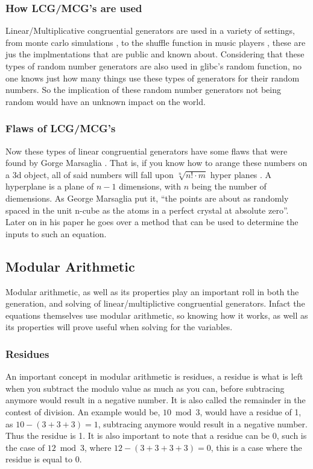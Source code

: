 \documentclass[12pft, english]{article}
\begin{document}
\begin{multicols}{2}
  \subsubsection{How LCG/MCG's are used}
  Linear/Multiplicative congruential generators are used in a variety of settings, from monte carlo simulations \citep{fallOntoPlanes}, to the shuffle function in music players \citep{jukSource}, these are jus the implmentations that are public and known about. Considering that these types of random number generators are also used in glibc's \citep{linuxRNG} random function, no one knows just how many things use these types of generators for their random numbers. So the implication of these random number generators not being random would have an unknown impact on the world.
  \subsubsection{Flaws of LCG/MCG's}
  Now these types of linear congruential generators have some flaws that were found by Gorge Marsaglia \citep{fallOntoPlanes}. That is, if you know how to arange these numbers on a 3d object, all of said numbers will fall upon \(\sqrt[n]{{n}! \cdot m}\) hyper planes \citep{fallOntoPlanes}. A hyperplane is a plane of \(n-1 \) dimensions, with \(n\) being the number of diemensions. As George Marsaglia put it, ``the points are about as randomly spaced in the unit n-cube as the atoms in a perfect crystal at absolute zero''. Later on in his paper he goes over a method that can be used to determine the inputs to such an equation.
  \subsection{Modular Arithmetic}
  Modular arithmetic, as well as its properties play an important roll in both the generation, and solving of linear/multiplictive congruential generators. Infact the equations themselves use modular arithmetic, so knowing how it works, as well as its properties will prove useful when solving for the variables. \citep{modArth}
  \subsubsection{Residues}
  An important concept in modular arithmetic is residues, a residue is what is left when you subtract the modulo value as much as you can, before subtracing anymore would result in a negative number. It is also called the remainder in the contest of division. An example would be, \( 10 \bmod 3\), would have a residue of 1, as \(10 - ( 3 + 3 + 3 ) = 1\), subtracing anymore would result in a negative number. Thus the residue is 1. It is also important to note that a residue can be 0, such is the case of \( 12 \bmod 3\), where \( 12 - ( 3 + 3 + 3 + 3 ) = 0\), this is a case where the residue is equal to 0. \citep{modArth}

\end{multicols}
\end{document}
